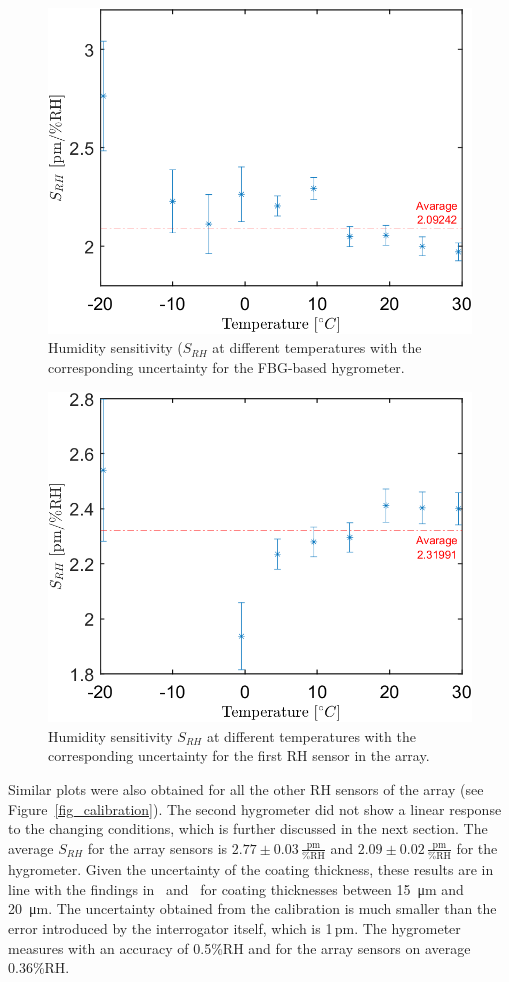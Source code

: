 \begin{figure}[!h]
\centering
\includegraphics[width=0.55\columnwidth]{Chapter5/images/RHS_RH.png}
\caption{Humidity sensitivity ($S_{RH}$ at different temperatures with the corresponding uncertainty for the FBG-based hygrometer.}
\label{fig_RH_sens}
\end{figure}
\begin{figure}[!h]
\centering
\includegraphics[width=0.55\columnwidth]{Chapter5/images/RH1_RH.png}
\caption{Humidity sensitivity $S_{RH}$ at different temperatures with the corresponding uncertainty for the first \gls{RH} sensor in the array.}
\label{fig_RH_sens2}
\end{figure}

Similar plots were also obtained for all the other \gls{RH} sensors of the array (see Figure~\ref{fig_calibration}). The second hygrometer did not show a linear response to the changing conditions, which is further discussed in the next section.
\newpage
The average $S_{RH}$ for the array sensors is $2.77\pm 0.03\,\mathrm{\frac{pm}{\%RH}}$  and $2.09\pm 0.02\,\mathrm{\frac{pm}{\%RH}}$ for the hygrometer. Given the uncertainty of the coating thickness, these results are in line with the findings in~\cite{YEO_PI} and~\cite{Kronenberg:02} for coating thicknesses between \SI{15}{\micro\metre} and \SI{20}{\micro\metre}. The uncertainty obtained from the calibration is much smaller than the error introduced by the interrogator itself, which is 1\,pm. The hygrometer measures with an accuracy of 0.5\%RH and for the array sensors on average 0.36\%RH. 

